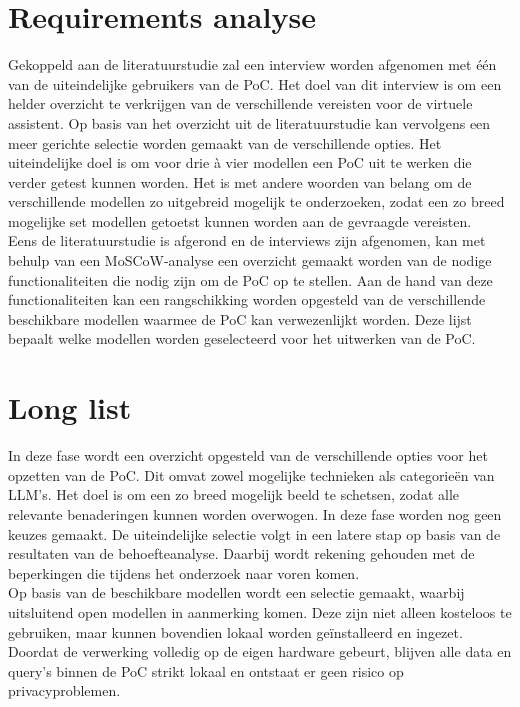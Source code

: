 \section{Requirements analyse}

Gekoppeld aan de literatuurstudie zal een interview worden afgenomen met één van de uiteindelijke gebruikers van de PoC. Het doel van dit interview is om een helder overzicht te verkrijgen van de verschillende vereisten voor de virtuele assistent. Op basis van het overzicht uit de literatuurstudie kan vervolgens een meer gerichte selectie worden gemaakt van de verschillende opties. Het uiteindelijke doel is om voor drie à vier modellen een PoC uit te werken die verder getest kunnen worden. Het is met andere woorden van belang om de verschillende modellen zo uitgebreid mogelijk te onderzoeken, zodat een zo breed mogelijke set modellen getoetst kunnen worden aan de gevraagde vereisten. 
\\[1em]
Eens de literatuurstudie is afgerond en de interviews zijn afgenomen, kan met behulp van een MoSCoW-analyse een overzicht gemaakt worden van de nodige functionaliteiten die nodig zijn om de PoC op te stellen. Aan de hand van deze functionaliteiten kan een rangschikking worden opgesteld van de verschillende beschikbare modellen waarmee de PoC kan verwezenlijkt worden. Deze lijst bepaalt welke modellen worden geselecteerd voor het uitwerken van de PoC.

\section{Long list}

In deze fase wordt een overzicht opgesteld van de verschillende opties voor het opzetten van de PoC. Dit omvat zowel mogelijke technieken als categorieën van LLM’s. Het doel is om een zo breed mogelijk beeld te schetsen, zodat alle relevante benaderingen kunnen worden overwogen. In deze fase worden nog geen keuzes gemaakt. De uiteindelijke selectie volgt in een latere stap op basis van de resultaten van de behoefteanalyse. Daarbij wordt rekening gehouden met de beperkingen die tijdens het onderzoek naar voren komen.
\\[1em]
Op basis van de beschikbare modellen wordt een selectie gemaakt, waarbij uitsluitend open modellen in aanmerking komen. Deze zijn niet alleen kosteloos te gebruiken, maar kunnen bovendien lokaal worden geïnstalleerd en ingezet. Doordat de verwerking volledig op de eigen hardware gebeurt, blijven alle data en query’s binnen de PoC strikt lokaal en ontstaat er geen risico op privacyproblemen.

